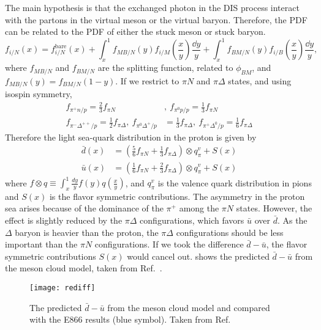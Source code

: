 \documentclass[../main.tex]{subfiles}
\begin{document}
The main hypothesis is that the exchanged photon in the DIS process interact with the partons in the
virtual meson or the virtual
baryon. Therefore, the PDF can be related to the PDF of either the stuck meson or stuck baryon.
\begin{equation}
	f_{i/N}\left(x\right) = f_{i/N}^{\mathrm{bare}}\left(x\right) +  \int^1_x f_{MB/N}\left(y\right) f_{i/M}\left(\frac{x}{y}\right) \frac{\dd{y}}{y} + \int^1_x f_{BM/N}\left(y\right) f_{i/B}\left(\frac{x}{y}\right) \frac{\dd{y}}{y},
\end{equation}
where $f_{MB/N}$ and $f_{BM/N}$ are the splitting function, related to $\phi_{BM}$, and $f_{MB/N}(y)=f_{BM/N}(1-y)$.
If we restrict to $\pi N$ and $\pi\Delta$ states, and using isospin symmetry,
\begin{align}
	f_{\pi^+n/p}=\frac{2}{3} f_{\pi N}                                       & , ~f_{\pi^0 p/p}=\frac{1}{3} f_{\pi N}                                         \\
	f_{\pi^-\Delta^{++}/p}=\frac{1}{2} f_{\pi \Delta}, ~f_{\pi^0 \Delta^+/p} & =\frac{1}{3} f_{\pi \Delta},  ~f_{\pi^+ \Delta^0/p}=\frac{1}{6} f_{\pi \Delta}
\end{align}
Therefore the light sea-quark distribution in the proton is given by
\begin{align}
	\bar{d}(x) & = \left(\frac{5}{6}f_{\pi N} + \frac{1}{3}f_{\pi \Delta}\right)\otimes q^v_\pi + S(x) \\
	\bar{u}(x) & = \left(\frac{1}{6}f_{\pi N} + \frac{2}{3}f_{\pi \Delta}\right)\otimes q^v_\pi + S(x)
	\label{eq:pion_dbub}
\end{align}
where $f\otimes q\equiv \int^1_x \frac{dy}{y}f(y)q\left(\frac{x}{y}\right)$, and $q^v_\pi$ is the valence
quark distribution in pions and $S(x)$ is the flavor symmetric contributions.
The asymmetry in the proton sea arises because of the dominance of the $\pi^+$ among the $\pi N$ states.
However, the effect is slightly reduced by the $\pi\Delta$ configurations, which favors $\bar{u}$ over $\bar{d}$.
As the $\Delta$ baryon is heavier than the proton, the $\pi\Delta$ configurations should be less important than
the $\pi N$ configurations.
If we took the difference $\bar{d}-\bar{u}$, the flavor symmetric contributions $S(x)$ would cancel out.
shows the predicted $\bar{d}-\bar{u}$ from the meson cloud model, taken from Ref.~\cite{alberg2022}.
\begin{figure}
	\centering
	\texttt{[image: rediff]}
	\caption{The predicted $\bar{d}-\bar{u}$ from the meson cloud model and compared with the E866 results (blue symbol). Taken from Ref.~\cite{alberg2022}}
	\label{fig:pion_cloud}
\end{figure}
\end{document}

